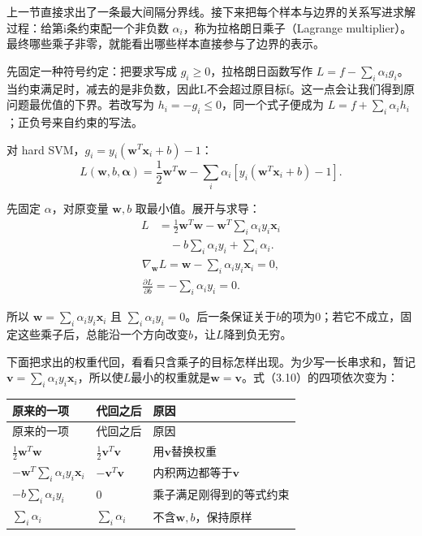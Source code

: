 

上一节直接求出了一条最大间隔分界线。接下来把每个样本与边界的关系写进求解过程：给第i条约束配一个非负数 \(\alpha_i\)，称为拉格朗日乘子（Lagrange multiplier）。最终哪些乘子非零，就能看出哪些样本直接参与了边界的表示。


先固定一种符号约定：把要求写成 \(g_i\ge0\)，拉格朗日函数写作 \(L=f-\sum_i\alpha_i g_i\)。当约束满足时，减去的是非负数，因此L不会超过原目标f。这一点会让我们得到原问题最优值的下界。若改写为 \(h_i=-g_i\le0\)，同一个式子便成为 \(L=f+\sum_i\alpha_i h_i\)；正负号来自约束的写法。


对 hard SVM，\(g_i=y_i(\mathbf w^T\mathbf x_i+b)-1\)：
\[
L(\mathbf w,b,\boldsymbol\alpha)=\frac12\mathbf w^T\mathbf w-\sum_i\alpha_i[y_i(\mathbf w^T\mathbf x_i+b)-1].\tag{3.9}
\]


先固定 \(\alpha\)，对原变量 \(\mathbf w,b\) 取最小值。展开与求导：
\[
\begin{aligned}L&=\frac12\mathbf w^T\mathbf w-\mathbf w^T\sum_i\alpha_iy_i\mathbf x_i\\
&\quad-b\sum_i\alpha_i y_i+\sum_i\alpha_i.\end{aligned}\tag{3.10}
\]
\[
\begin{gathered}\nabla_{\mathbf w}L=\mathbf w-\sum_i\alpha_iy_i\mathbf x_i=0,\\[3pt]
\frac{\partial L}{\partial b}=-\sum_i\alpha_i y_i=0.\end{gathered}\tag{3.11}
\]


所以 \(\mathbf w=\sum_i\alpha_i y_i\mathbf x_i\) 且 \(\sum_i\alpha_i y_i=0\)。后一条保证关于\(b\)的项为0；若它不成立，固定这些乘子后，总能沿一个方向改变\(b\)，让\(L\)降到负无穷。


下面把求出的权重代回，看看只含乘子的目标怎样出现。为少写一长串求和，暂记\(\mathbf v=\sum_i\alpha_i y_i\mathbf x_i\)，所以使\(L\)最小的权重就是\(\mathbf w=\mathbf v\)。式（3.10）的四项依次变为：


\begingroup
\small\setlength{\tabcolsep}{3pt}
\renewcommand{\arraystretch}{1.22}
\begin{longtable}{@{}>{\raggedright\arraybackslash}p{}>{\raggedright\arraybackslash}p{}>{\raggedright\arraybackslash}p{}@{}}
\toprule
原来的一项 & 代回之后 & 原因 \\
\midrule\endfirsthead
原来的一项 & 代回之后 & 原因 \\
\midrule\endhead
\bottomrule\endfoot
\(\tfrac12\mathbf w^T\mathbf w\) & \(\tfrac12\mathbf v^T\mathbf v\) & 用\(\mathbf v\)替换权重 \\
\(-\mathbf w^T\sum_i\alpha_i y_i\mathbf x_i\) & \(-\mathbf v^T\mathbf v\) & 内积两边都等于\(\mathbf v\) \\
\(-b\sum_i\alpha_i y_i\) & \(0\) & 乘子满足刚得到的等式约束 \\
\(\sum_i\alpha_i\) & \(\sum_i\alpha_i\) & 不含\(\mathbf w,b\)，保持原样 \\
\end{longtable}
\endgroup


